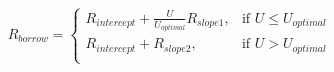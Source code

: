 \documentclass[preview]{standalone}
\begin{document}
\begin{align*}
R_{borrow} = \begin{cases}R_{intercept} + \frac{U}{U_{optimal}}R_{slope1}, & \text{if } U \leq U_{optimal} \\R_{intercept} + R_{slope2}, & \text{if } U > U_{optimal}\\\end{cases}
\end{align*}
\end{document}
